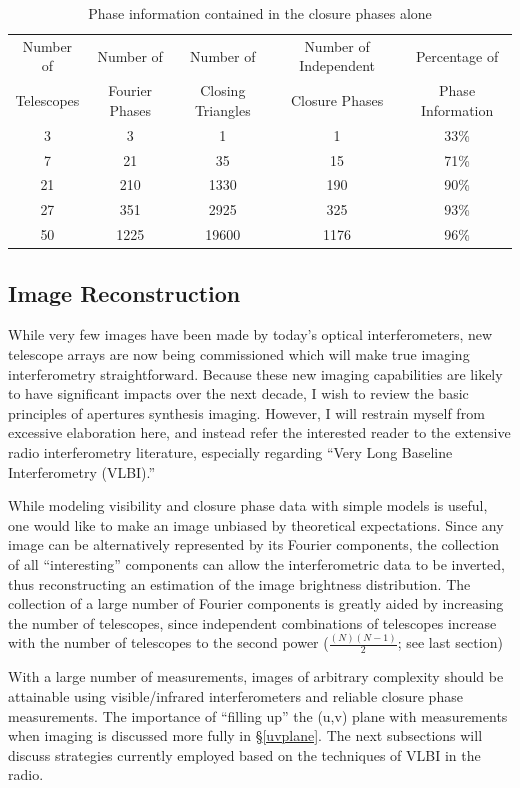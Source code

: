 \documentclass[12pt]{iopart}
\begin{document}
\begin{table}
\footnotesize
\caption {Phase information contained in the closure phases alone
\label{monnier_table1}}
\begin{center}
\begin{tabular}{ccccc}
Number of  & Number of & Number of & Number of Independent & Percentage of \\
Telescopes & Fourier Phases & Closing Triangles & Closure Phases & Phase Information \\
\hline
3 & 3 & 1 & 1 & 33\% \\
7 & 21 & 35 & 15 & 71\% \\
21 & 210 & 1330 & 190 & 90\% \\
27 & 351 & 2925 & 325 & 93\% \\
50 & 1225 & 19600 & 1176 & 96\% \\
\end{tabular}
\end{center}
\end{table}


\subsection{Image Reconstruction}
While very few images have been made by today's optical
interferometers, new telescope arrays are now being commissioned which
will make true imaging interferometry straightforward.  Because these
new imaging capabilities are likely to have significant impacts over
the next decade, I wish to review the basic principles of apertures
synthesis imaging.  However, I will restrain myself from excessive
elaboration here,
and instead refer the interested reader to the extensive
radio interferometry literature, especially regarding ``Very Long
Baseline Interferometry (VLBI).''

While modeling visibility and closure phase data with simple models is
useful, one would like to make an image unbiased by theoretical
expectations.  Since any image can be alternatively represented by its
Fourier components, the collection of all ``interesting'' components
can allow the interferometric data to be inverted, thus reconstructing
an estimation of the image brightness distribution.  The collection of a large
number of Fourier components is greatly aided by increasing the number
of telescopes, since independent combinations of telescopes increase
with the number of telescopes to the second power 
($\frac{(N)(N-1)}{2}$; see last section)
  
With a large number of measurements, images of arbitrary complexity
should be attainable using visible/infrared interferometers and
reliable closure phase measurements.  The importance of ``filling up''
the (u,v) plane with measurements when imaging is discussed more fully
in \S\ref{uvplane}.  The next subsections will discuss strategies
currently employed based on the techniques of VLBI in the radio.
\end{document}
